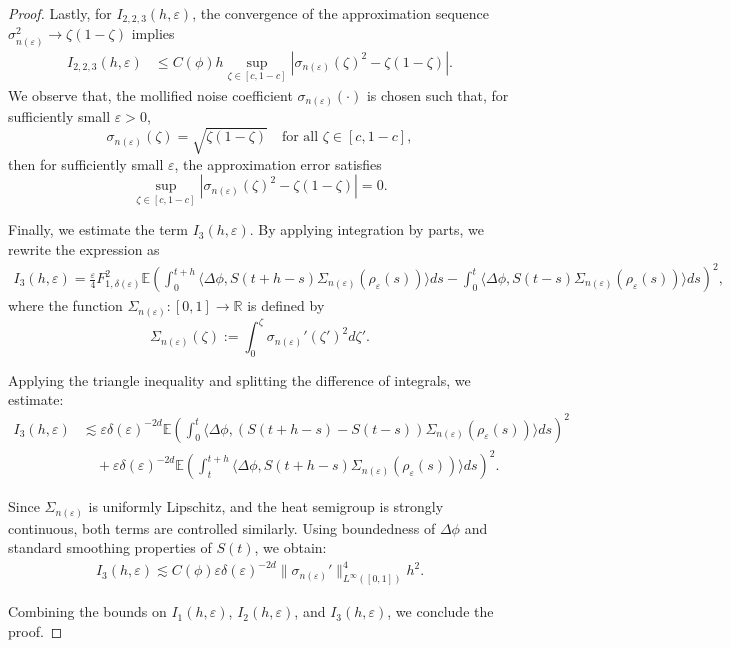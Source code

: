 \documentclass[UTF-8,reqno]{amsart}
\numberwithin{equation}{section}
\def\leq{\leqslant}
\def\leq{\leqslant}
\begin{document}
\begin{proof}
Lastly, for $ I_{2,2,3}(h,\varepsilon) $, the convergence of the approximation sequence $ \sigma_{n(\varepsilon)}^2 \to \zeta(1 - \zeta) $ implies
\begin{align*}
I_{2,2,3}(h,\varepsilon)
&\leq C(\phi) h \sup_{\zeta \in [c, 1 - c]} \left| \sigma_{n(\varepsilon)}(\zeta)^2 - \zeta(1 - \zeta) \right|.
\end{align*}
We observe that, the mollified noise coefficient $ \sigma_{n(\varepsilon)}(\cdot) $ is chosen such that, for sufficiently small $\varepsilon>0$, 
$$
\sigma_{n(\varepsilon)}(\zeta) = \sqrt{\zeta(1 - \zeta)} \quad \text{for all } \zeta \in [c, 1 - c],
$$
then for sufficiently small $ \varepsilon $, the approximation error satisfies
$$
\sup_{\zeta \in [c, 1 - c]} \left| \sigma_{n(\varepsilon)}(\zeta)^2 - \zeta(1 - \zeta) \right| = 0.
$$






Finally, we estimate the term $ I_3(h,\varepsilon) $. By applying integration by parts, we rewrite the expression as
\begin{align*}
I_3(h,\varepsilon)
= \frac{\varepsilon}{4} F_{1,\delta(\varepsilon)}^2 
\mathbb{E} \left( 
\int_0^{t+h} \langle \Delta \phi, S(t+h - s) \Sigma_{n(\varepsilon)}(\rho_{\varepsilon}(s)) \rangle ds 
- \int_0^t \langle \Delta \phi, S(t - s) \Sigma_{n(\varepsilon)}(\rho_{\varepsilon}(s)) \rangle ds 
\right)^2,
\end{align*}
where the function $ \Sigma_{n(\varepsilon)} \colon [0,1] \to \mathbb{R} $ is defined by
$$
\Sigma_{n(\varepsilon)}(\zeta) := \int_0^{\zeta} \sigma_{n(\varepsilon)}'(\zeta')^2 d\zeta'.
$$

Applying the triangle inequality and splitting the difference of integrals, we estimate:
\begin{align*}
I_3(h,\varepsilon)
&\lesssim \varepsilon \delta(\varepsilon)^{-2d} 
\mathbb{E} \left( \int_0^t \langle \Delta \phi, \left( S(t+h - s) - S(t - s) \right) \Sigma_{n(\varepsilon)}(\rho_{\varepsilon}(s)) \rangle ds \right)^2 \\
&\quad + \varepsilon \delta(\varepsilon)^{-2d} 
\mathbb{E} \left( \int_t^{t+h} \langle \Delta \phi, S(t+h - s) \Sigma_{n(\varepsilon)}(\rho_{\varepsilon}(s)) \rangle ds \right)^2.
\end{align*}

Since $ \Sigma_{n(\varepsilon)} $ is uniformly Lipschitz, and the heat semigroup is strongly continuous, both terms are controlled similarly. Using boundedness of $ \Delta \phi $ and standard smoothing properties of $ S(t) $, we obtain:
\begin{align*}
I_3(h,\varepsilon) 
\lesssim C(\phi) \varepsilon \delta(\varepsilon)^{-2d} 
\| \sigma_{n(\varepsilon)}' \|_{L^{\infty}([0,1])}^4 h^2.
\end{align*}

Combining the bounds on $ I_1(h,\varepsilon) $, $ I_2(h,\varepsilon) $, and $ I_3(h,\varepsilon) $, we conclude the proof.

\end{proof}
\end{document}
